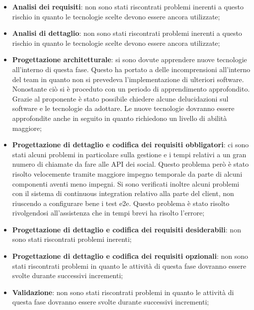 			\begin{itemize}
				\item \textbf{Analisi dei requisiti}: non sono stati riscontrati problemi inerenti a questo rischio in quanto le tecnologie scelte devono essere ancora utilizzate;
				\item \textbf{Analisi di dettaglio}: non sono stati riscontrati problemi inerenti a questo rischio in quanto le tecnologie scelte devono essere ancora utilizzate;
				\item \textbf{Progettazione architetturale}: si sono dovute apprendere nuove tecnologie all'interno di questa fase. Questo ha portato a delle incomprensioni all'interno del team in quanto non si prevedeva l'implementazione di ulteriori software. Nonostante ciò si è proceduto con un periodo di apprendimento approfondito. Grazie al proponente è stato possibile chiedere alcune delucidazioni sul software e le tecnologie da adottare. Le nuove tecnologie dovranno essere approfondite anche in seguito in quanto richiedono un livello di abilità maggiore;
				\item \textbf{Progettazione di dettaglio e codifica dei requisiti obbligatori}: ci sono stati alcuni problemi in particolare sulla gestione e i tempi relativi a un gran numero di chiamate da fare alle API dei social. Questo problema però è stato risolto velocemente tramite maggiore impegno temporale da parte di alcuni componenti aventi meno impegni. Si sono verificati inoltre alcuni problemi con il sistema di continuous integration relativo alla parte del client, non riuscendo a configurare bene i test e2e. Questo problema è stato risolto rivolgendosi all'assistenza che in tempi brevi ha risolto l'errore;
				\item \textbf{Progettazione di dettaglio e codifica dei requisiti desiderabili}: non sono stati riscontrati problemi inerenti;
				\item \textbf{Progettazione di dettaglio e codifica dei requisiti opzionali}: non sono stati riscontrati problemi in quanto le attività di questa fase dovranno essere svolte durante successivi incrementi;
				\item \textbf{Validazione}: non sono stati riscontrati problemi in quanto le attività di questa fase dovranno essere svolte durante successivi incrementi;
			\end{itemize}



